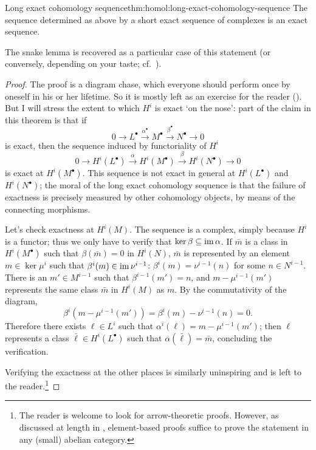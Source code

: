 \begin{thm}{Long exact cohomology sequence}{thm:homol:long-exact-cohomology-sequence}
  The sequence determined as above by a short exact sequence of
  complexes is an exact sequence.
\end{thm}

The snake lemma is recovered as a particular case of this statement
(or conversely, depending on your taste; cf.\
).

\begin{proof}
  The proof is a diagram chase, which everyone should perform once by
  oneself in his or her lifetime. So it is mostly left as an exercise
  for the reader
  (). But I
  will stress the extent to which $H^i$ is exact `on the nose': part
  of the claim in this theorem is that if
  \[
    0 \longrightarrow L^\bullet \xrightarrow{\alpha^\bullet} M^\bullet
    \xrightarrow{\beta^\bullet} N^\bullet \longrightarrow 0
  \]
  is exact, then the sequence induced by functoriality of $H^i$
  \[
    0 \longrightarrow H^i(L^\bullet) \xrightarrow{\alpha}
    H^i(M^\bullet) \xrightarrow{\beta} H^i(N^\bullet) \longrightarrow
    0
  \]
  is exact at $H^i(M^\bullet)$. This sequence is not exact in general
  at $H^i(L^\bullet)$ and $H^i(N^\bullet)$; the moral of the long
  exact cohomology sequence is that the failure of exactness is
  precisely measured by other cohomology objects, by means of the
  connecting morphisms.

  Let's check exactness at $H^i(M)$. The sequence is a complex, simply
  because $H^i$ is a functor; thus we only have to verify that
  $\ker\beta \subseteq \operatorname{im}\alpha$. If $\bar m$ is a class in
  $H^i(M^\bullet)$ such that $\beta(\bar m) = 0$ in $H^i(N)$, $\bar m$
  is represented by an element $m \in \ker\mu^i$ such that
  $\beta^i(m) \in \operatorname{im}\nu^{i-1}$: $\beta^i(m) = \nu^{i-1}(n)$ for
  some $n \in N^{i-1}$. There is an $m' \in M^{i-1}$ such that
  $\beta^{i-1}(m') = n$, and $m - \mu^{i-1}(m')$ represents the same
  class $\bar m$ in $H^i(M)$ as $m$. By the commutativity of the
  diagram,
  \[
    \beta^i(m - \mu^{i-1}(m')) = \beta^i(m) - \nu^{i-1}(n) = 0.
  \]
  Therefore there exists $\ell \in L^i$ such that
  $\alpha^i(\ell) = m - \mu^{i-1}(m')$; then $\ell$ represents a class
  $\bar\ell \in H^i(L^\bullet)$ such that $\alpha(\bar\ell) = \bar m$,
  concluding the verification.

  Verifying the exactness at the other places is similarly uninspiring
  and is left to the reader.\footnote{The reader is welcome to look
    for arrow-theoretic proofs. However, as discussed at length in
    \Cref{sec:homol:working-in-abelian-categories}, element-based
    proofs suffice to prove the statement in any (small) abelian
    category.}
\end{proof}

